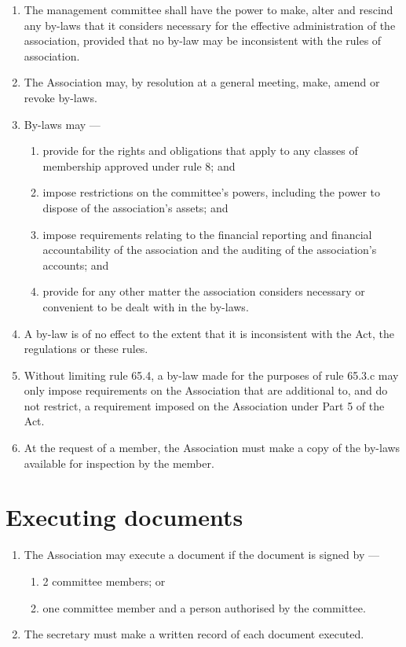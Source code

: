 \begin{enumerate}

\item The management committee shall have the power to make, alter and rescind any by-laws that it considers necessary for the effective administration of the association, provided that no by-law may be inconsistent with the rules of association.
\item The Association may, by resolution at a general meeting, make, amend or revoke by-laws.
\item By-laws may ---

  \begin{enumerate}
  
  \item provide for the rights and obligations that apply to any classes of membership approved under rule 8; and
  \item impose restrictions on the committee's powers, including the power to dispose of the association's assets; and
  \item impose requirements relating to the financial reporting and financial accountability of the association and the auditing of the association's accounts; and
  \item provide for any other matter the association considers necessary or convenient to be dealt with in the by-laws.
  \end{enumerate}
\item A by-law is of no effect to the extent that it is inconsistent with the Act, the regulations or these rules.
\item Without limiting rule 65.4, a by-law made for the purposes of rule 65.3.c may only impose requirements on the Association that are additional to, and do not restrict, a requirement imposed on the Association under Part 5 of the Act.
\item At the request of a member, the Association must make a copy of the by-laws available for inspection by the member.
\end{enumerate}

\hypertarget{executing-documents}{%
\section{Executing documents}\label{executing-documents}}

\begin{enumerate}

\item The Association may execute a document if the document is signed by ---

  \begin{enumerate}
  
  \item 2 committee members; or
  \item one committee member and a person authorised by the committee.
  \end{enumerate}
\item The secretary must make a written record of each document executed.
\end{enumerate}

